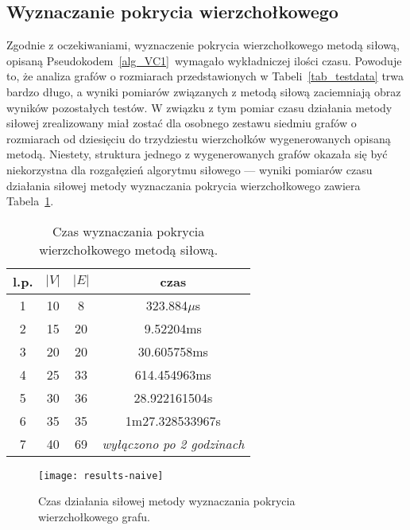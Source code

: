 \subsection{Wyznaczanie pokrycia wierzchołkowego}
\par{
  Zgodnie z oczekiwaniami, wyznaczenie pokrycia wierzchołkowego metodą siłową, opisaną Pseudokodem~\ref{alg_VC1} wymagało wykładniczej ilości czasu.
  Powoduje to, że analiza grafów o rozmiarach przedstawionych w Tabeli~\ref{tab_testdata} trwa bardzo długo, a wyniki pomiarów związanych z metodą siłową zaciemniają obraz wyników pozostałych testów.
  W związku z tym pomiar czasu działania metody siłowej zrealizowany miał zostać dla osobnego zestawu siedmiu grafów o rozmiarach od dziesięciu do trzydziestu wierzchołków wygenerowanych opisaną metodą.
  Niestety, struktura jednego z wygenerowanych grafów okazała się być niekorzystna dla rozgałęzień algorytmu siłowego --- wyniki pomiarów czasu działania siłowej metody wyznaczania pokrycia wierzchołkowego zawiera Tabela~\ref{tab_vc_naive}.
  \begin{table}
    \begin{center}
      \begin{tabular}{| c | c | c | c |}
        \hline
        l.p. & $|V|$ & $|E|$ & czas \\ \hline
        1 & 10 & 8 & 323.884$\mu$s \\
        2 & 15 & 20 & 9.52204ms \\
        3 & 20 & 20 & 30.605758ms \\
        4 & 25 & 33 & 614.454963ms \\
        5 & 30 & 36 & 28.922161504s \\
        6 & 35 & 35 & 1m27.328533967s \\
        7 & 40 & 69 & \textit{wyłączono po 2 godzinach} \\ \hline
      \end{tabular} 
    \end{center}
    \caption{Czas wyznaczania pokrycia wierzchołkowego metodą siłową.}
    \label{tab_vc_naive}
  \end{table}
  \begin{figure}
    \caption{Czas działania siłowej metody wyznaczania pokrycia wierzchołkowego grafu.}
    \label{fig_results_naive}
    \centering
      \texttt{[image: results-naive]}
  \end{figure}
}
